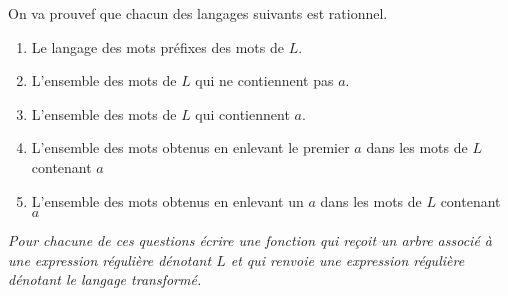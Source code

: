 On va prouvef que chacun des langages suivants est rationnel.
\begin{enumerate}
\item Le langage des mots préfixes des mots de $L$.
\item L'ensemble des mots de $L$ qui ne contiennent pas $a$.
\item L'ensemble des mots de $L$ qui contiennent $a$.
\item L'ensemble des mots obtenus en enlevant le premier $a$ dans les mots de $L$ contenant $a$
\item L'ensemble des mots obtenus en enlevant un $a$ dans les mots de $L$ contenant $a$
\end{enumerate}
\begin{Exercise}
{\it Pour chacune de ces questions écrire une fonction qui reçoit un arbre associé à une expression régulière dénotant $L$ et qui renvoie une expression régulière dénotant le langage transformé.}
\end{Exercise}
